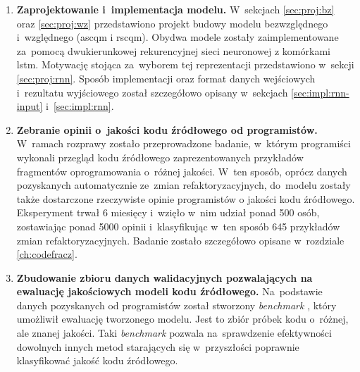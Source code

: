 \documentclass[twoside]{praca}
\begin{document}
\begin{enumerate}

    \item \textbf{Zaprojektowanie i~implementacja modelu.} W~sekcjach \ref{sec:proj:bz} oraz \ref{sec:proj:wz} przedstawiono projekt budowy modelu bezwzględnego i~względnego (\gls{ascqm} i \gls{rscqm}). Obydwa modele zostały zaimplementowane za~pomocą dwukierunkowej rekurencyjnej sieci neuronowej z komórkami \gls{lstm}. Motywację stojąca za~wyborem tej reprezentacji przedstawiono w~sekcji \ref{sec:proj:rnn}. Sposób implementacji oraz format danych wejściowych i~rezultatu wyjściowego został szczegółowo opisany w~sekcjach \ref{sec:impl:rnn-input} i~\ref{sec:impl:rnn}.
    
    \item \textbf{Zebranie opinii o~jakości kodu źródłowego od programistów.} W~ramach rozprawy zostało przeprowadzone badanie, w~którym programiści wykonali przegląd kodu źródłowego zaprezentowanych przykładów fragmentów oprogramowania o~różnej jakości. W~ten sposób, oprócz danych pozyskanych automatycznie ze~zmian refaktoryzacyjnych, do~modelu zostały także dostarczone rzeczywiste opinie programistów o jakości kodu źródłowego. Eksperyment trwał 6 miesięcy i~wzięło w~nim udział ponad 500 osób, zostawiając ponad 5000 opinii i~klasyfikując w~ten sposób 645 przykładów zmian refaktoryzacyjnych. Badanie zostało szczegółowo opisane w~rozdziale \ref{ch:codefracz}.
    
    \item \textbf{Zbudowanie zbioru danych walidacyjnych pozwalających na ewaluację jakościowych modeli kodu źródłowego.} Na~podstawie danych pozyskanych od programistów został stworzony \textit{benchmark} \cite{fracz:benchmark}, który umożliwił ewaluację tworzonego modelu. Jest to zbiór próbek kodu o~różnej, ale znanej jakości. Taki \textit{benchmark} pozwala na~sprawdzenie efektywności dowolnych innych metod starających się w~przyszłości poprawnie klasyfikować jakość kodu źródłowego. 
    

\end{enumerate}
\end{document}
